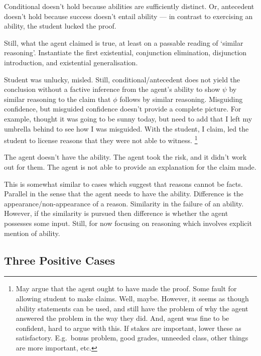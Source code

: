 \documentclass[10pt]{article}
\newcommand{\hozlinedash}[0]{%
  \noindent\hdashrule[0.5ex][c]{\textwidth}{.1pt}{2.5pt}
}
\begin{document}
\begin{note}
  Conditional doesn't hold because abilities are sufficiently distinct.
  Or, antecedent doesn't hold because success doesn't entail ability --- in contrast to exercising an ability, the student lucked the proof.

  Still, what the agent claimed is true, at least on a passable reading of `similar reasoning'.
  Instantiate the first existential, conjunction elimination, disjunction introduction, and existential generalisation.

  Student was unlucky, misled.
  Still, conditional/antecedent does not yield the conclusion without a factive inference from the agent's ability to show \(\psi\) by similar reasoning to the claim that \(\phi\) follows by similar reasoning.
  Misguiding confidence, but misguided confidence doesn't provide a complete picture.
  For example, thought it was going to be sunny today, but need to add that I left my umbrella behind to see how I was misguided.
  With the student, I claim, led the student to license reasons that they were not able to witness.\nolinebreak
  \footnote{
    May argue that the agent ought to have made the proof.
    Some fault for allowing student to make claims.
    Well, maybe.
    However, it seems as though ability statements can be used, and still have the problem of why the agent answered the problem in the way they did.
    And, agent was fine to be confident, hard to argue with this.
    If stakes are important, lower these as satisfactory.
    E.g.\ bonus problem, good grades, unneeded class, other things are more important, etc.
  }
  \hozlinedash

  The agent doesn't have the ability.
  The agent took the risk, and it didn't work out for them.
  The agent is not able to provide an explanation for the claim made.
\end{note}

\begin{note}
  This is somewhat similar to cases which suggest that reasons cannot be facts.
  Parallel in the sense that the agent needs to have the ability.
  Difference is the appearance/non-appearance of a reason.
  Similarity in the failure of an ability.
  However, if the similarity is pursued then difference is whether the agent possesses some input.
  Still, for now focusing on reasoning which involves explicit mention of ability.
\end{note}


\subsection{Three Positive Cases}
\label{sec:positive-cases}
\end{document}
